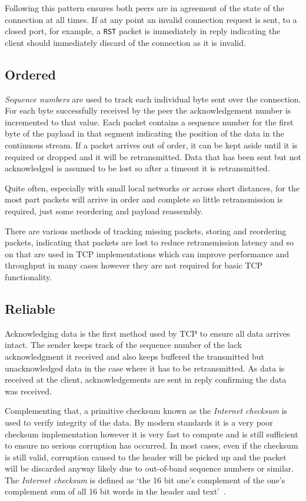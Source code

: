 \documentclass[11pt,a4paper,british]{bhamarticle}
\begin{document}
\begin{multicols}{2}
Following this pattern ensures both peers are in agreement of the state of the connection at all times. If at any point an invalid connection request is sent, to a closed port, for example, a \texttt{RST} packet is immediately in reply indicating the client should immediately discard of the connection as it is invalid.
\subsection{Ordered}
\textit{Sequence numbers} are used to track each individual byte sent over the connection. For each byte successfully received by the peer the acknowledgement number is incremented to that value. Each packet contains a sequence number for the first byte of the payload in that segment indicating the position of the data in the continuous stream. If a packet arrives out of order, it can be kept aside until it is required or dropped and it will be retransmitted. Data that has been sent but not acknowledged is assumed to be lost so after a timeout it is retransmitted.

Quite often, especially with small local networks or across short distances, for the most part packets will arrive in order and complete so little retransmission is required, just some reordering and payload reassembly.

There are various methods of tracking missing packets, storing and reordering packets, indicating that packets are lost to reduce retransmission latency and so on that are used in TCP implementations which can improve performance and throughput in many cases however they are not required for basic TCP functionality.

\subsection{Reliable}\label{sec:reliable}
Acknowledging data is the first method used by TCP to ensure all data arrives intact. The sender keeps track of the sequence number of the lack acknowledgment it received and also keeps buffered the transmitted but unacknowledged data in the case where it has to be retransmitted. As data is received at the client, acknowledgements are sent in reply confirming the data was received.

Complementing that, a primitive checksum known as the \textit{Internet checksum} is used to verify integrity of the data. By modern standards it is a very poor checksum implementation however it is very fast to compute and is still sufficient to ensure no serious corruption has occurred. In most cases, even if the checksum is still valid, corruption caused to the header will be picked up and the packet will be discarded anyway likely due to out-of-band sequence numbers or similar. The \textit{Internet checksum} is defined as `the 16 bit one's complement of the one's complement sum of all 16 bit words in the header and text'~\cite[3.1]{rfc793}.


\end{multicols}
\end{document}
